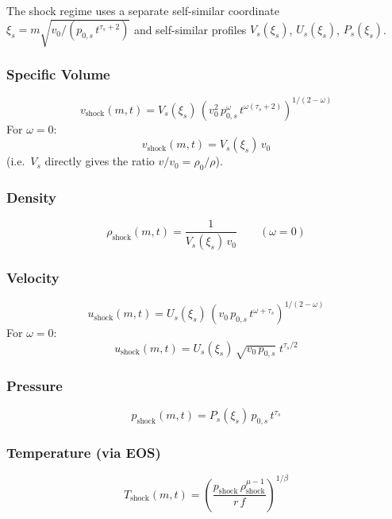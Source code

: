 \documentclass[11pt]{article}
\newcommand{\xsi}{\xi}
\begin{document}
The shock regime uses a separate self-similar coordinate $\xsi_s = m\sqrt{v_0/(p_{0,s}\,t^{\tau_s+2})}$ and self-similar profiles $V_s(\xsi_s)$, $U_s(\xsi_s)$, $P_s(\xsi_s)$.

\subsubsection{Specific Volume}
\begin{equation}
  \boxed{v_{\mathrm{shock}}(m,t) = V_s(\xsi_s)\,\left(v_0^2\,p_{0,s}^{\omega}\,t^{\omega(\tau_s+2)}\right)^{1/(2-\omega)}}
\end{equation}
For $\omega = 0$:
\begin{equation}
  v_{\mathrm{shock}}(m,t) = V_s(\xsi_s)\,v_0
\end{equation}
(i.e.\ $V_s$ directly gives the ratio $v/v_0 = \rho_0/\rho$).

\subsubsection{Density}
\begin{equation}
  \boxed{\rho_{\mathrm{shock}}(m,t) = \frac{1}{V_s(\xsi_s)\,v_0} \qquad(\omega=0)}
\end{equation}

\subsubsection{Velocity}
\begin{equation}
  \boxed{u_{\mathrm{shock}}(m,t) = U_s(\xsi_s)\,\left(v_0\,p_{0,s}\,t^{\omega+\tau_s}\right)^{1/(2-\omega)}}
\end{equation}
For $\omega = 0$:
\begin{equation}
  u_{\mathrm{shock}}(m,t) = U_s(\xsi_s)\,\sqrt{v_0\,p_{0,s}}\;t^{\tau_s/2}
\end{equation}

\subsubsection{Pressure}
\begin{equation}
  \boxed{p_{\mathrm{shock}}(m,t) = P_s(\xsi_s)\,p_{0,s}\,t^{\tau_s}}
\end{equation}

\subsubsection{Temperature (via EOS)}
\begin{equation}
  \boxed{T_{\mathrm{shock}}(m,t) = \left(\frac{p_{\mathrm{shock}}\,\rho_{\mathrm{shock}}^{\mu-1}}{r\,f}\right)^{1/\beta}}
\end{equation}
\end{document}
